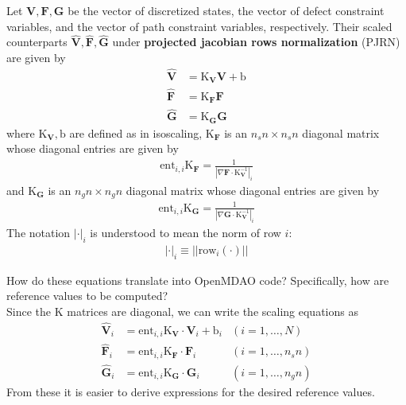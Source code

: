\documentclass{article}
\theoremstyle{definition}
\begin{document}
\hline
\noindent
Let $\textbf{V},\textbf{F},\textbf{G}$ be the vector of discretized states, the vector of defect constraint variables, and the vector of path constraint variables, respectively. Their scaled counterparts $\hat{\textbf{V}},\hat{\textbf{F}},\hat{\textbf{G}}$ under \textbf{projected jacobian rows normalization} (PJRN) are given by
\begin{align*}
    \hat{\textbf{V}} &= \text{K}_\textbf{V} \textbf{V} + \text{b} \\
    \hat{\textbf{F}} &= \text{K}_\textbf{F} \textbf{F} \\
    \hat{\textbf{G}} &= \text{K}_\textbf{G} \textbf{G}
\end{align*}
where $\text{K}_\textbf{V}, \text{b}$ are defined as in isoscaling, $\text{K}_\textbf{F}$ is an $n_sn \times n_sn$ diagonal matrix whose diagonal entries are given by
\begin{align*}
    \text{ent}_{i,i} \text{K}_\textbf{F} = \frac{1}{|\nabla \textbf{F} \cdot \text{K}_\textbf{V}^{-1}|_i}
\end{align*}
and $\text{K}_\textbf{G}$ is an $n_gn \times n_gn$ diagonal matrix whose diagonal entries are given by
\begin{align*}
    \text{ent}_{i,i} \text{K}_\textbf{G} = \frac{1}{|\nabla \textbf{G} \cdot \text{K}_\textbf{V}^{-1}|_i}
\end{align*}
The notation $|\cdot|_i$ is understood to mean the norm of row $i$:
\begin{align*}
    |\cdot|_i \equiv ||\text{row}_i(\cdot)||
\end{align*}
\hline

\noindent
How do these equations translate into OpenMDAO code? Specifically, how are reference values to be computed? \\

\noindent
Since the $\text{K}$ matrices are diagonal, we can write the scaling equations as
\begin{align*}
    \hat{\textbf{V}}_i &= \text{ent}_{i,i} \text{K}_\textbf{V} \cdot \textbf{V}_i + \text{b}_i & (i = 1,\dots,N) \\
    \hat{\textbf{F}}_i &= \text{ent}_{i,i} \text{K}_\textbf{F} \cdot \textbf{F}_i & (i = 1,\dots,n_sn)\\
    \hat{\textbf{G}}_i &= \text{ent}_{i,i} \text{K}_\textbf{G} \cdot \textbf{G}_i & (i = 1,\dots,n_gn)
\end{align*}
From these it is easier to derive expressions for the desired reference values. \\
\end{document}
